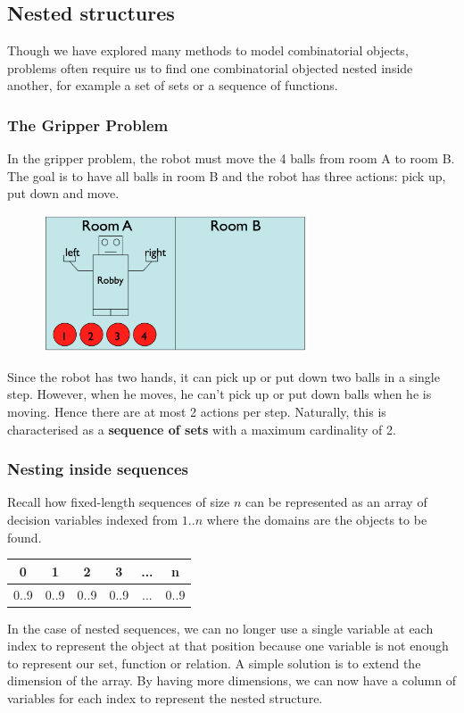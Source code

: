 \documentclass[CS4402-Notes.tex]{subfiles}
\begin{document}
\subsection{Nested structures}
Though we have explored many methods to model combinatorial objects, problems often require us to find one combinatorial objected nested inside another, for example a set of sets or a sequence of functions.

\subsubsection{The Gripper Problem}
In the gripper problem, the robot must move the 4 balls from room A to room B. The goal is to have all balls in room B and the robot has three actions: pick up, put down and move.
\begin{figure}[H]
\centering
\includegraphics[width=0.7\textwidth, keepaspectratio]{imgs/gripper-problem.png}
\end{figure}
\noindent
Since the robot has two hands, it can pick up or put down two balls in a single step. However, when he moves, he can't pick up or put down balls when he is moving. Hence there are at most 2 actions per step. Naturally, this is characterised as a \textbf{sequence of sets} with a maximum cardinality of 2.

\subsubsection{Nesting inside sequences}
Recall how fixed-length sequences of size $n$ can be represented as an array of decision variables indexed from $1..n$ where the domains are the objects to be found.
\begin{table}[H]
\centering
\begin{tabular}{| c | c | c | c | c | c |}
\hline
\textbf{0} & \textbf{1} & \textbf{2} & \textbf{3} & \textbf{...} & \textbf{n} \\
\hline
0..9 & 0..9 & 0..9 & 0..9 & ...& 0..9 \\ 
\hline
\end{tabular}
\end{table}
In the case of nested sequences, we can no longer use a single variable at each index to represent the object at that position because one variable is not enough to represent our set, function or relation. A simple solution is to extend the dimension of the array. By having more dimensions, we can now have a column of variables for each index to represent the nested structure.
\end{document}
